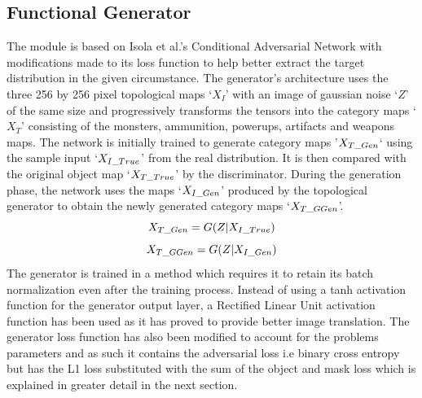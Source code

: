 \documentclass{Configuration_Files/PoliMi3i_thesis}
\begin{document}
\subsection{Functional Generator}
The module is based on Isola et al.’s Conditional Adversarial Network with 
modifications made to its loss function to help better extract the target distribution in 
the given circumstance. The generator’s architecture uses the three 256 by 256 pixel 
topological maps ‘$X_{I}$’ with an image of gaussian noise ‘$Z$’ of the same size and 
progressively transforms the tensors into the category maps ‘$X_{T}$’ consisting of the 
monsters, ammunition, powerups, artifacts and weapons maps. The network is 
initially trained to generate category maps ’$X_{T\char`_Gen}$‘ using the sample input ‘$X_{I\char`_True}$’ 
from the real distribution. It is then compared with the original object map ‘$X_{T\char`_True}$’ by 
the discriminator. During the generation phase, the network uses the maps ‘$X_{I\char`_Gen}$’ 
produced by the topological generator to obtain the newly generated category maps 
‘$X_{T\char`_GGen}$’.
\begin{equation} \label{eq:ctgen}
X_{T\char`_Gen} = G(Z|X_{I\char`_True}) 
\end{equation}
\begin{equation} \label{eq:cggen}
X_{T\char`_GGen} = G(Z|X_{I\char`_Gen})
\end{equation}
The generator is trained in a method which requires it to retain its batch 
normalization even after the training process. Instead of using a tanh activation 
function for the generator output layer, a Rectified Linear Unit activation function 
has been used as it has proved to provide better image translation. The generator loss 
function has also been modified to account for the problems parameters and as such 
it contains the adversarial loss i.e binary cross entropy but has the L1 loss substituted 
with the sum of the object and mask loss which is explained in greater detail in the 
next section.
\end{document}
